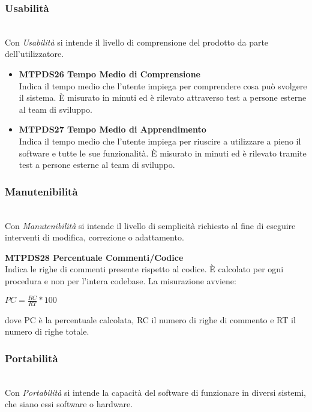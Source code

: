 \subsubsection{Usabilità}\-\\
Con \textit{Usabilità} si intende il livello di comprensione del prodotto da parte dell'utilizzatore.
\begin{itemize}
	\item\textbf{MTPDS26 Tempo Medio di Comprensione}\-\\
Indica il tempo medio che l'utente impiega per comprendere cosa può svolgere il sistema. È misurato in minuti ed è rilevato attraverso test a persone esterne al team di sviluppo.

	\item\textbf{MTPDS27 Tempo Medio di Apprendimento}\-\\
Indica il tempo medio che l'utente impiega per riuscire a utilizzare a pieno il software e tutte le sue funzionalità. È  misurato in minuti ed è rilevato tramite test a persone esterne al team di sviluppo. 

\end{itemize}

\subsubsection{Manutenibilità}\-\\
Con \textit{Manutenibilità} si intende il livello di semplicità richiesto al fine di eseguire interventi di modifica, correzione o adattamento.
\begin{itemize}
	\item \textbf{MTPDS28 Percentuale Commenti/Codice}\-\\
	Indica le righe di commenti presente rispetto al codice. È  calcolato per ogni procedura e non per l'intera codebase. La misurazione avviene:
	\begin{center}
		\item $PC = \frac{RC}{RT}*100$
	\end{center}
	dove PC è la percentuale calcolata, RC il numero di righe di commento e RT il numero di righe totale.
\end{itemize}

\subsubsection{Portabilità}\-\\
Con \textit{Portabilità} si intende la capacità del software di funzionare in diversi sistemi, che siano essi software o hardware.